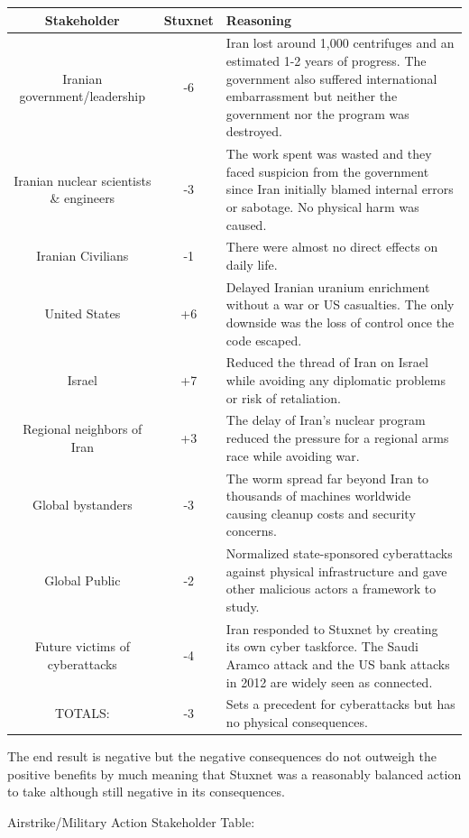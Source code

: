 \begin{table}[h]
\centering
\begin{tabular}{|c|c|p{8cm}|}
\hline
Stakeholder & Stuxnet & Reasoning \\ \hline
Iranian government/leadership & -6 & Iran lost around 1,000 centrifuges and an estimated 1-2 years of progress. The government also suffered international embarrassment but neither the government nor the program was destroyed. \\ \hline
Iranian nuclear scientists \& engineers & -3 & The work spent was wasted and they faced suspicion from the government since Iran initially blamed internal errors or sabotage. No physical harm was caused. \\ \hline
Iranian Civilians & -1 & There were almost no direct effects on daily life. \\ \hline
United States & +6 & Delayed Iranian uranium enrichment without a war or US casualties. The only downside was the loss of control once the code escaped. \\ \hline
Israel & +7 & Reduced the thread of Iran on Israel while avoiding any diplomatic problems or risk of retaliation. \\ \hline
Regional neighbors of Iran & +3 & The delay of Iran’s nuclear program reduced the pressure for a regional arms race while avoiding war. \\ \hline
Global bystanders & -3 & The worm spread far beyond Iran to thousands of machines worldwide causing cleanup costs and security concerns. \\ \hline
Global Public & -2 & Normalized state-sponsored cyberattacks against physical infrastructure and gave other malicious actors a framework to study. \\ \hline
Future victims of cyberattacks & -4 & Iran responded to Stuxnet by creating its own cyber taskforce. The Saudi Aramco attack and the US bank attacks in 2012 are widely seen as connected. \\ \hline
TOTALS: & -3 & Sets a precedent for cyberattacks but has no physical consequences. \\ \hline
\end{tabular}
\end{table}

The end result is negative but the negative consequences do not outweigh the positive benefits by much meaning that Stuxnet was a reasonably balanced action to take although still negative in its consequences.

Airstrike/Military Action Stakeholder Table:


